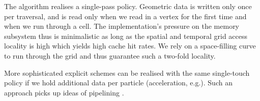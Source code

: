 \begin{observation}
The algorithm realises a single-pass policy. Geometric data is written only once
per traversal, and is read only when we read in a vertex for the first time and
when we run through a cell.
The implementation's pressure on the memory subsystem thus is minimalistic as
long as the spatial and temporal grid access locality \cite{dime} is high which
yields high cache hit rates.
We rely on a space-filling curve to
run through the grid \cite{Weinzierl:2009:Diss,Weinzierl:11:Peano} and thus
guarantee such a two-fold locality.
\end{observation}


\noindent
More sophisticated explicit schemes can be realised with the same single-touch
policy if we hold additional data per particle (acceleration, e.g.).
Such an approach picks up ideas of pipelining \cite{Plimpton1995}.
